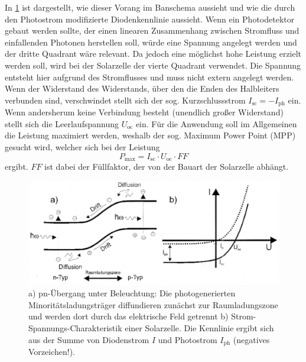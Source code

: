 \documentclass[
	a4paper,
	12pt,
	pagesize,
	ngerman
]{scrartcl}
\begin{document}
	In \cref{fig_photodiode_kennlinie} ist dargestellt, wie dieser Vorang im Banschema aussieht und wie die durch den Photostrom modifizierte Diodenkennlinie aussieht.
	Wenn ein Photodetektor gebaut werden sollte, der einen linearen Zusammenhang zwischen Stromfluss und einfallenden Photonen herstellen soll, würde eine Spannung angelegt werden und der dritte Quadrant wäre relevant.
	Da jedoch eine möglichst hohe Leistung erzielt werden soll, wird bei der Solarzelle der vierte Quadrant verwendet.
	Die Spannung entsteht hier aufgrund des Stromflusses und muss nicht extern angelegt werden.
	Wenn der Widerstand des Widerstands, über den die Enden des Halbleiters verbunden sind, verschwindet stellt sich der sog. Kurzschlussstrom $ I_\text{sc} = - I_\text{ph}$ ein.
	Wenn andersherum keine Verbindung besteht (unendlich großer Widerstand) stellt sich die Leerlaufspannung $ U_\text{oc}$ ein.
	Für die Anwendung soll im Allgemeinen die Leistung maximiert werden, weshalb der sog. Maximum Power Point (MPP) gesucht wird, welcher sich bei der Leistung
	\begin{equation}
			\label{eq_mpp}
			P_\text{max} = I_\text{sc} \cdot U_\text{oc} \cdot FF
	\end{equation}
	ergibt.
	$FF$ ist dabei der Füllfaktor, der von der Bauart der Solarzelle abhängt.

	\begin{figure}[H]
			\includegraphics[width= 0.8 \linewidth]{img/photodiode} %
			\caption{
			a) pn-Übergang unter Beleuchtung: Die photogenerierten Minoritätsladungsträger diffundieren zunächst zur Raumladungszone und werden dort durch das elektrische Feld getrennt
			b) Strom-Spannungs-Charakteristik einer Solarzelle. Die Kennlinie ergibt sich aus der Summe von Diodenstrom $ I $ und Photostrom $ I_\text{ph} $ (negatives Vorzeichen!).
			\cite{anleitung}
			}
			\label{fig_photodiode_kennlinie}
	\end{figure}
\end{document}
